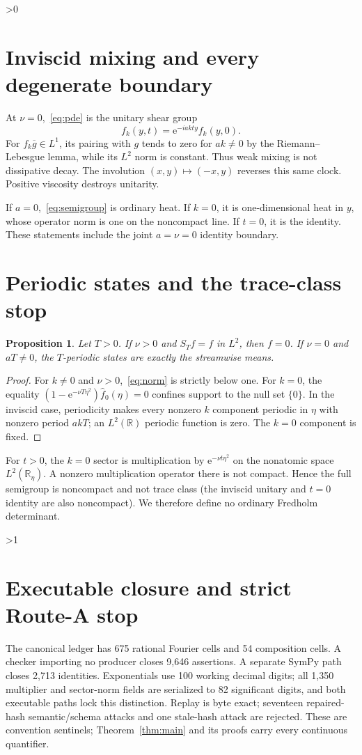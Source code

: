 \documentclass[9pt]{extarticle}
\newtheorem{proposition}{Proposition}
\newcommand{\R}{\mathbb R}
\newcommand{\e}{\mathrm e}
\begin{document}
\ifnum\CRevisionRound>0
\section{Inviscid mixing and every degenerate boundary}
At $\nu=0$,~\eqref{eq:pde} is the unitary shear group
\[
 f_k(y,t)=\e^{-iakty}f_k(y,0).
\]
For $f_k\overline g\in L^1$, its pairing with $g$ tends to zero for $ak\ne0$
by the Riemann--Lebesgue lemma, while its $L^2$ norm is constant.  Thus weak
mixing is not dissipative decay.  The involution $(x,y)\mapsto(-x,y)$ reverses
this same clock.  Positive viscosity destroys unitarity.

If $a=0$,~\eqref{eq:semigroup} is ordinary heat.  If $k=0$, it is
one-dimensional heat in $y$, whose operator norm is one on the noncompact
line.  If $t=0$, it is the identity.  These statements include the joint
$a=\nu=0$ identity boundary.

\section{Periodic states and the trace-class stop}
\begin{proposition}\label{prop:periodic}
Let $T>0$.  If $\nu>0$ and $S_Tf=f$ in $L^2$, then $f=0$.  If $\nu=0$ and
$aT\ne0$, the $T$-periodic states are exactly the streamwise means.
\end{proposition}
\begin{proof}
For $k\ne0$ and $\nu>0$,~\eqref{eq:norm} is strictly below one.  For $k=0$,
the equality $(1-\e^{-\nu T\eta^2})\widehat f_0(\eta)=0$ confines support to
the null set $\{0\}$.  In the inviscid case, periodicity makes every nonzero
$k$ component periodic in $\eta$ with nonzero period $akT$; an $L^2(\R)$
periodic function is zero.  The $k=0$ component is fixed.
\end{proof}

For $t>0$, the $k=0$ sector is multiplication by $\e^{-\nu t\eta^2}$ on the
nonatomic space $L^2(\R_\eta)$.  A nonzero multiplication operator there is
not compact.  Hence the full semigroup is noncompact and not trace class
(the inviscid unitary and $t=0$ identity are also noncompact).  We therefore
define no ordinary Fredholm determinant.
\fi

\ifnum\CRevisionRound>1
\section{Executable closure and strict Route-A stop}
The canonical ledger has 675 rational Fourier cells and 54 composition cells.
A checker importing no producer closes 9,646 assertions.  A separate SymPy
path closes 2,713 identities.  Exponentials use 100 working decimal digits;
all 1,350 multiplier and sector-norm fields are serialized to 82 significant
digits, and both executable paths lock this distinction.  Replay is byte
exact; seventeen repaired-hash semantic/schema attacks and one stale-hash
attack are rejected.  These are
convention sentinels; Theorem~\ref{thm:main} and its proofs carry every
continuous quantifier.
\end{document}
